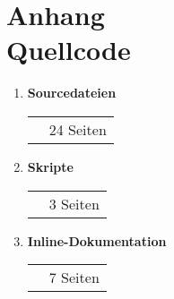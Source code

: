 \addtocounter{chapter}{1}
\chapter*{Anhang \thechapter\\[1.2cm] Quellcode}
\label{Quellcode}

\begin{center}
  \begin{minipage}[c]{8cm}
    \begin{enumerate}
    \item \textbf{Sourcedateien}\\
      \begin{tabular}{p{4cm}r}
        & 24 Seiten\\
      \end{tabular}
    \item \textbf{Skripte}\\
      \begin{tabular}{p{4cm}r}
        & 3 Seiten\\
      \end{tabular}
      \item \textbf{Inline-Dokumentation}\\
      \begin{tabular}{p{4cm}r}
        & 7 Seiten\\
      \end{tabular}
    \end{enumerate}
  \end{minipage}
\end{center}
\clearpage
\lhead{}
\ 
\cleardoublepage